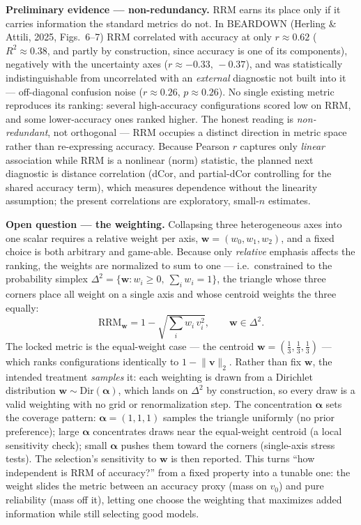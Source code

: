 \smallskip
\noindent\textbf{Preliminary evidence --- non-redundancy.} RRM earns its place only if it carries information the standard metrics do not. In BEARDOWN (Herling \& Attili, 2025, Figs.~6--7) RRM correlated with accuracy at only $r\approx0.62$ ($R^2\approx0.38$, and partly by construction, since accuracy is one of its components), negatively with the uncertainty axes ($r\approx-0.33,\,-0.37$), and was statistically indistinguishable from uncorrelated with an \emph{external} diagnostic not built into it --- off-diagonal confusion noise ($r\approx0.26$, $p\approx0.26$). No single existing metric reproduces its ranking: several high-accuracy configurations scored low on RRM, and some lower-accuracy ones ranked higher. The honest reading is \emph{non-redundant}, not orthogonal --- RRM occupies a distinct direction in metric space rather than re-expressing accuracy. Because Pearson $r$ captures only \emph{linear} association while RRM is a nonlinear (norm) statistic, the planned next diagnostic is distance correlation (dCor, and partial-dCor controlling for the shared accuracy term), which measures dependence without the linearity assumption; the present correlations are exploratory, small-$n$ estimates.

\smallskip
\noindent\textbf{Open question --- the weighting.} Collapsing three heterogeneous axes into one scalar requires a relative weight per axis, $\mathbf{w}=(w_0,w_1,w_2)$, and a fixed choice is both arbitrary and game-able. Because only \emph{relative} emphasis affects the ranking, the weights are normalized to sum to one --- i.e.\ constrained to the probability simplex $\Delta^{2}=\{\mathbf{w}:w_i\ge 0,\ \sum_i w_i=1\}$, the triangle whose three corners place all weight on a single axis and whose centroid weights the three equally:
\[
  \mathrm{RRM}_{\mathbf{w}} = 1-\sqrt{\textstyle\sum_i w_i\,v_i^{2}},
  \qquad \mathbf{w}\in\Delta^{2}.
\]
The locked metric is the equal-weight case --- the centroid $\mathbf{w}=(\tfrac13,\tfrac13,\tfrac13)$ --- which ranks configurations identically to $1-\lVert\mathbf{v}\rVert_2$. Rather than fix $\mathbf{w}$, the intended treatment \emph{samples} it: each weighting is drawn from a Dirichlet distribution $\mathbf{w}\sim\mathrm{Dir}(\boldsymbol{\alpha})$, which lands on $\Delta^{2}$ by construction, so every draw is a valid weighting with no grid or renormalization step. The concentration $\boldsymbol{\alpha}$ sets the coverage pattern: $\boldsymbol{\alpha}=(1,1,1)$ samples the triangle uniformly (no prior preference); large $\boldsymbol{\alpha}$ concentrates draws near the equal-weight centroid (a local sensitivity check); small $\boldsymbol{\alpha}$ pushes them toward the corners (single-axis stress tests). The selection's sensitivity to $\mathbf{w}$ is then reported. This turns ``how independent is RRM of accuracy?'' from a fixed property into a tunable one: the weight slides the metric between an accuracy proxy (mass on $v_0$) and pure reliability (mass off it), letting one choose the weighting that maximizes added information while still selecting good models.

